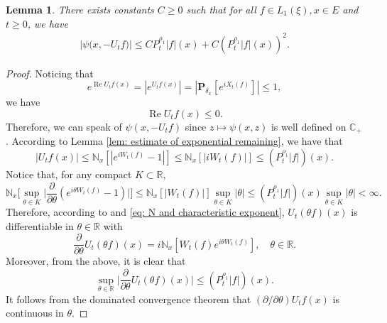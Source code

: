 \documentclass[12pt,a4paper]{amsart}
\theoremstyle{plain}
\newtheorem{lem}[thm]{Lemma}
\theoremstyle{definition}
\numberwithin{equation}{section}
\begin{document}
\begin{lem}
    There exists constants $C\geq 0$ such that for all $f \in L_1(\xi),x\in E$ and $t\geq 0$, we have
\begin{equation}\begin{split}
\label{eq: upper bound of psi(v)}
    \big|\psi\big(x,-U_tf\big)\big|
    \leq C P^{\rho_1}_t |f|(x)+
         C (P^{\rho_1}_t |f| (x))^2.
\end{split}\end{equation}
\end{lem}
\begin{proof}
     Noticing that
\[
    e^{\operatorname{Re} U_tf(x)}
    = |e^{U_tf(x)}|
    = |\mathbf P_{\delta_x}[e^{i X_t(f)}]|
    \leq 1,
\]
    we have
\begin{equation}
\label{eq: -v has positive real part}
 \operatorname{Re} U_tf(x)
    \leq 0.
\end{equation}
    Therefore, we can speak of $\psi(x,-U_tf)$ since $z\mapsto \psi(x,z)$ is well defined on $\mathbb C_+$.
    According to Lemma \ref{lem: estimate of exponential remaining}, we have that
\begin{equation}
\label{eq: upper bound for vf}
    |U_tf(x)| \leq \mathbb N_x[|e^{i W_t(f)} - 1|]
    \leq \mathbb N_x[|i W_t(f)|]
    \leq (P^{\rho_1}_t |f|)(x).
\end{equation}
    Notice that, for any compact $K \subset \mathbb R$,
\begin{equation}
\label{eq: estimate of deriavetive of v(theta)}
    \mathbb N_x\Big[\sup_{\theta \in K} \Big|\frac{\partial}{\partial \theta} (e^{i\theta W_t(f)} - 1) \Big|\Big]
    \leq \mathbb N_x[|W_t(f)|] \sup_{\theta \in K}|\theta|
    \leq (P^{\rho_1}_t |f|)(x) \sup_{\theta \in K}|\theta| < \infty.
\end{equation}
    Therefore, according to \cite[Theorem A.5.2.]{Durrett2010Probability} and \eqref{eq: N and characteristic exponent},
    $U_t(\theta f)(x)$ is differentiable in $\theta \in \mathbb R$ with
\[
    \frac{\partial}{\partial \theta} U_t(\theta f)(x)
    = i\mathbb N_x[W_t(f)e^{i\theta W_t(f)}],
    \quad \theta \in \mathbb R.
\]
    Moreover, from the above, it is clear that
\begin{equation}
\label{eq: upper bounded for derivative of v(theta)}
    \sup_{\theta \in \mathbb R}\Big| \frac{\partial}{\partial \theta}U_t(\theta f)(x)\Big|
    \leq ( P^{\rho_1}_t |f|)(x).
\end{equation}
    It follows from the dominated convergence theorem that $(\partial/\partial \theta)U_tf(x)$ is continuous in $\theta$.

\end{proof}
\end{document}

